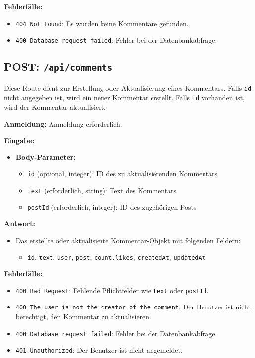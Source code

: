 \documentclass[a4paper,12pt]{article}
\begin{document}
\textbf{Fehlerfälle:}
\begin{itemize}
    \item \texttt{404 Not Found}:
        Es wurden keine Kommentare gefunden.
    \item \texttt{400 Database request failed}:
        Fehler bei der Datenbankabfrage.
\end{itemize}

\newpage
\subsection{POST: \texttt{/api/comments}}

Diese Route dient zur Erstellung oder Aktualisierung eines Kommentars. Falls
\texttt{id} nicht angegeben ist, wird ein neuer Kommentar erstellt. Falls
\texttt{id} vorhanden ist, wird der Kommentar aktualisiert.

\textbf{Anmeldung:} Anmeldung erforderlich.

\textbf{Eingabe:}
\begin{itemize}
    \item \textbf{Body-Parameter:}
    \begin{itemize}
        \item \texttt{id} (optional, integer):
            ID des zu aktualisierenden Kommentars
        \item \texttt{text} (erforderlich, string):
            Text des Kommentars
        \item \texttt{postId} (erforderlich, integer):
            ID des zugehörigen Posts
    \end{itemize}
\end{itemize}

\textbf{Antwort:}
\begin{itemize}
    \item Das erstellte oder aktualisierte Kommentar-Objekt mit folgenden
        Feldern:
    \begin{itemize}
        \item \texttt{id},
              \texttt{text},
              \texttt{user},
              \texttt{post},
              \texttt{count.likes},
              \texttt{createdAt},
              \texttt{updatedAt}
    \end{itemize}
\end{itemize}

\textbf{Fehlerfälle:}
\begin{itemize}
    \item \texttt{400 Bad Request}:
        Fehlende Pflichtfelder wie \texttt{text} oder \texttt{postId}.
    \item \texttt{400 The user is not the creator of the comment}:
        Der Benutzer ist nicht berechtigt, den Kommentar zu aktualisieren.
    \item \texttt{400 Database request failed}:
        Fehler bei der Datenbankabfrage.
    \item \texttt{401 Unauthorized}:
        Der Benutzer ist nicht angemeldet.
\end{itemize}
\end{document}
